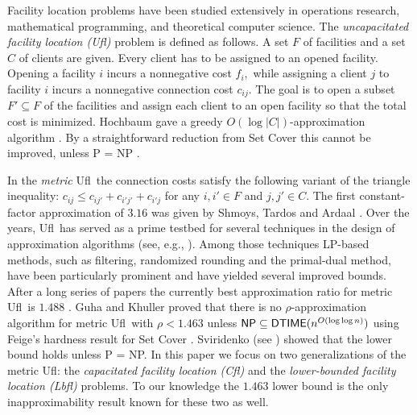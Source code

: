 \documentclass[11pt]{article}\usepackage{amsmath}
\newcommand{\lbfl}{{\sc Lbfl}}
\newcommand{\cfl}{{\sc Cfl}}
\newcommand{\ufl}{{\sc Ufl}}
\begin{document}
Facility location problems have been studied extensively in 
 operations research,
mathematical programming, and theoretical computer science. 
The 
{\em uncapacitated facility location (\ufl)} problem is defined as follows. 
A set $F$ of 
facilities  and a set $C$ of  clients  are given. 
Every client has to be assigned to an opened facility. 
Opening a facility
$i$ incurs a nonnegative cost $f_i,$ while assigning a client $j$ to facility
$i$ incurs a nonnegative connection cost  $c_{ij}.$  The goal is to open a subset 
$F' \subseteq F$ of the facilities and  assign each
client to an open facility so that  the total cost is minimized. 
Hochbaum gave a greedy  $O(\log |C|)$-approximation algorithm
\cite{Hochbaum82}. By a straightforward reduction from Set Cover this
cannot be improved, unless {\sf P = NP} \cite{RazS97}. 

In the {\em metric} \ufl\ 
the connection  costs satisfy the following variant of the triangle inequality:
$c_{ij} \leq c_{ij'} + c_{i'j'} + c_{i'j}$ for any $i, i'\in F$ and $j, j' \in C.$
The first constant-factor approximation of $3.16$ was given by Shmoys, 
Tardos and Ardaal \cite{ShmoysTA97}. Over the years,
\ufl\ has served as a prime testbed for several techniques in
the design of approximation algorithms (see, e.g., 
\cite{ShmoysWbook}). Among those techniques LP-based
methods, such as filtering, randomized rounding and the primal-dual method,
 have been particularly prominent and have yielded several improved bounds.
After a long series of papers 
the currently best approximation ratio
for metric \ufl\ is $1.488$ \cite{Li11}. 
Guha and Khuller \cite{GuhaK99} proved that there is 
no $\rho$-approximation algorithm for metric \ufl\ with 
$\rho < 1.463$ unless ${\sf NP} \subseteq {\sf
DTIME}(n^{O(\log \log n)})$ using Feige's hardness result for Set
Cover \cite{Feige98}.
Sviridenko (see \cite{Vygen05}) showed that the lower bound holds
unless {\sf P = NP.}
In this paper we focus on two generalizations of the metric \ufl:  the 
 {\em capacitated facility location (\cfl\/)} and
 the {\em lower-bounded facility location (\lbfl\/)} problems.
To our knowledge  the $1.463$ lower bound  is the only inapproximability result known
for these two as well. 
\end{document}
